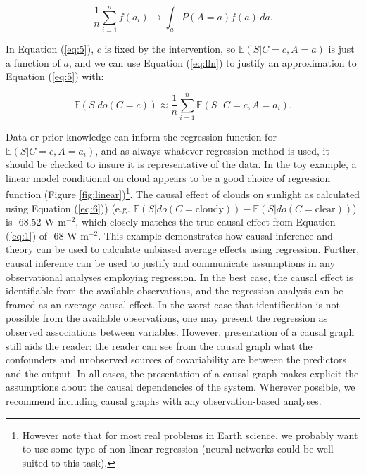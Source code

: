 \documentclass[12pt]{article}
\begin{document}
\begin{equation}
  \frac{1}{n} \sum_{i=1}^n f(a_i) \to \int_a P(A=a) f(a) \, d a.
  \label{eq:lln}
\end{equation}

In Equation (\ref{eq:5}), $c$ is fixed by the intervention, so
$\mathbb{E}(S| C=c, A=a)$ is just a function of $a$, and we can use
Equation (\ref{eq:lln}) to justify an approximation to Equation
(\ref{eq:5}) with:

\begin{equation}
  \mathbb{E}(S | do(C = c))  \approx \frac{1}{n} \sum_{i=1}^n
  \mathbb{E}(S \, | \,
  C=c, A=a_i).
  \label{eq:6}
\end{equation}

Data or prior knowledge can inform the regression function for
$\mathbb{E}(S | C=c, A=a_i)$, and as always whatever regression method
is used, it should be checked to insure it is representative of the
data. In the toy example, a linear model conditional on cloud appears
to be a good choice of regression function (Figure
\ref{fig:linear})\footnote{However note that for most real problems in
  Earth science, we probably want to use some type of non linear
  regression (neural networks could be well suited to this
  task).}. The causal effect of clouds on sunlight as calculated using
Equation (\ref{eq:6})) (e.g.
$\mathbb{E}(S | do(C = \text{cloudy})) - \mathbb{E}(S | do(C =
\text{clear}))$) is -68.52 W m$^{-2}$, which closely matches the true
causal effect from Equation (\ref{eq:1}) of -68 W m$^{-2}$. This
example demonstrates how causal inference and theory can be used to
calculate unbiased average effects using regression. Further, causal
inference can be used to justify and communicate assumptions in any
observational analyses employing regression. In the best case, the
causal effect is identifiable from the available observations, and the
regression analysis can be framed as an average causal effect. In the
worst case that identification is not possible from the available
observations, one may present the regression as observed associations
between variables. However, presentation of a causal graph still aids
the reader: the reader can see from the causal graph what the
confounders and unobserved sources of covariability are between the
predictors and the output. In all cases, the presentation of a causal
graph makes explicit the assumptions about the causal dependencies of
the system. Wherever possible, we recommend including causal graphs
with any observation-based analyses.
\end{document}
